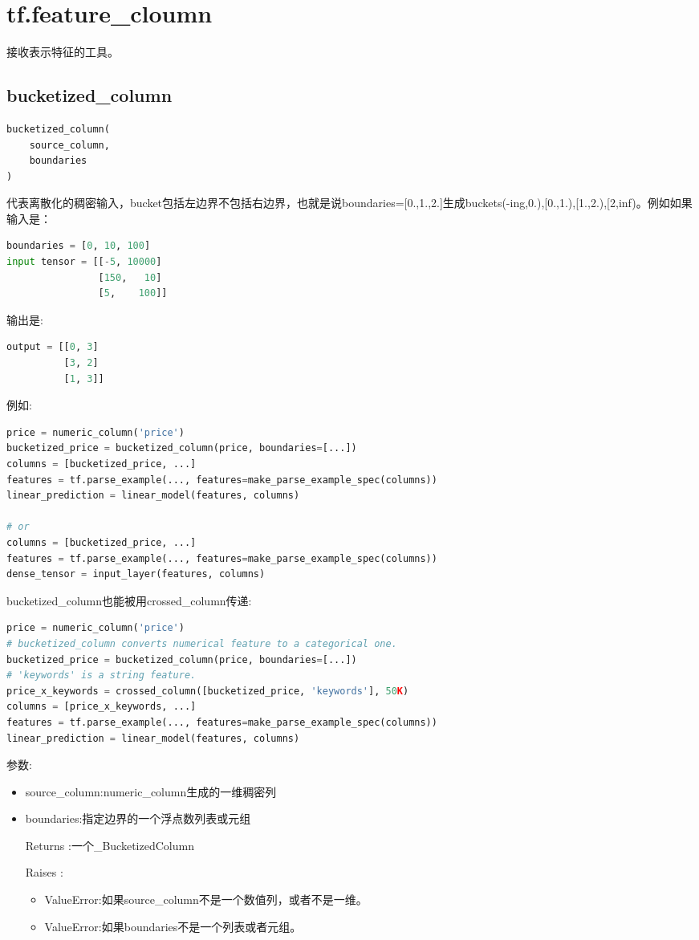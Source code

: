 \section{tf.feature\_cloumn}
接收表示特征的工具。
\subsection{bucketized\_column}
\begin{lstlisting}[language=Python]
bucketized_column(
    source_column,
    boundaries
)
\end{lstlisting}
代表离散化的稠密输入，bucket包括左边界不包括右边界，也就是说boundaries=[0.,1.,2.]生成buckets(-ing,0.),[0.,1.),[1.,2.),[2,inf)。例如如果输入是：
\begin{lstlisting}[language=Python]
boundaries = [0, 10, 100]
input tensor = [[-5, 10000]
                [150,   10]
                [5,    100]]
\end{lstlisting}
输出是:
\begin{lstlisting}[language=Python]
output = [[0, 3]
          [3, 2]
          [1, 3]]
\end{lstlisting}
例如:\par
\begin{lstlisting}[language=Python]
price = numeric_column('price')
bucketized_price = bucketized_column(price, boundaries=[...])
columns = [bucketized_price, ...]
features = tf.parse_example(..., features=make_parse_example_spec(columns))
linear_prediction = linear_model(features, columns)

# or
columns = [bucketized_price, ...]
features = tf.parse_example(..., features=make_parse_example_spec(columns))
dense_tensor = input_layer(features, columns)
\end{lstlisting}
bucketized\_column也能被用crossed\_column传递:
\begin{lstlisting}[language=Python]
price = numeric_column('price')
# bucketized_column converts numerical feature to a categorical one.
bucketized_price = bucketized_column(price, boundaries=[...])
# 'keywords' is a string feature.
price_x_keywords = crossed_column([bucketized_price, 'keywords'], 50K)
columns = [price_x_keywords, ...]
features = tf.parse_example(..., features=make_parse_example_spec(columns))
linear_prediction = linear_model(features, columns)
\end{lstlisting}
参数:
\begin{itemize}
	\item source\_column:numeric\_column生成的一维稠密列
	\item boundaries:指定边界的一个浮点数列表或元组
	\item[Returns]:一个\_BucketizedColumn
	\item[Raises]:
	\begin{itemize}
		\item ValueError:如果source\_column不是一个数值列，或者不是一维。
		\item ValueError:如果boundaries不是一个列表或者元组。
	\end{itemize}
\end{itemize}
